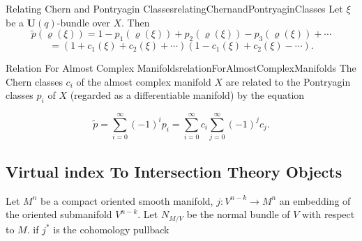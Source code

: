 \documentclass{book}
\begin{document}
\begin{Proof}
  \cite[theorem 4.8.1]{hirzebruchTopologicalMethodsAlgebraic1995}
\end{Proof}

\begin{thm}{Relating Chern and Pontryagin Classes}{relatingChernandPontryaginClasses}
Let $\xi$ be a $\mathbf{U}(q)$-bundle over $X$. Then
\[
    \tilde{p}(\varrho(\xi)) = 1 - p_1(\varrho(\xi)) + p_2(\varrho(\xi)) - p_3(\varrho(\xi)) + \cdots
\]
\[
    = (1 + c_1(\xi) + c_2(\xi) + \cdots)(1 - c_1(\xi) + c_2(\xi) - \cdots).
\]
\end{thm}

\begin{Proof}
  \cite[theorem~4.5.1]{hirzebruchTopologicalMethodsAlgebraic1995}
\end{Proof}

\begin{thm}{Relation For Almost Complex Manifolds}{relationForAlmostComplexManifolds}
  The Chern classes $c_i$ of the almost complex manifold $X$ are related to the Pontryagin classes $p_i$ of $X$ (regarded as a differentiable manifold) by the equation

  \[
      \tilde{p} = \sum_{i=0}^{\infty} (-1)^i p_i = \sum_{i=0}^{\infty} c_i \sum_{j=0}^{\infty} (-1)^j c_j.
  \]

\end{thm}

\begin{Proof}
  \cite[theorem~4.6.1]{hirzebruchTopologicalMethodsAlgebraic1995}
\end{Proof}

\subsection{Virtual index To Intersection Theory Objects}

Let $M^n$ be a compact oriented smooth manifold, $j: V^{n-k} \to M^n$  an embedding of the oriented
submanifold $V^{n-k}$. Let $N_{M/V}$ be the normal bundle of $V$ with respect to $M$. if $j^*$ is the
cohomology pullback
\end{document}

